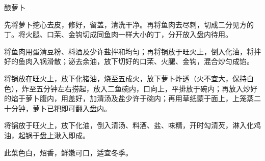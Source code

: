 \begin{recipe}{酿萝卜}

\ingredients



\cooking

\step 先将萝卜挖心去皮，修好，留盖，清洗干净。再将鱼肉去尽刺，切成二分见方的丁。将火腿、口茉、金钩切成同鱼肉一样大小的丁，分开放入盘内待用。

\step 将鱼肉用蛋清豆粉、料酒及少许盐拌和均匀；再将锅放于旺火上，倒入化油，将拌好的鱼肉入锅滑散；泌去余油，放下切好的口茉、火腿、金钩，混合炒匀成馅。

\step 将锅放在旺火上，放下化猪油，烧至五成火，放下萝卜炸透（火不宜大，保持白色），炸至五分钟左右捞起，放入二鱼碗内，口向上，平排放于碗内；再放入炒好的焰于萝卜腹内，用盖好，加清汤及盐少许于碗内；再用草纸蒙于面上，上笼蒸二十分钟，萝卜已粑即可翻入盘内。

\step 将锅放于旺火上，放下化油，倒入清汤、料酒、盐、味精，开时勾清芡，淋入化鸡油，起锅于盘上湫入即成。

\notes

此菜色白，炤香，鲜嫩可口，适宜冬季。

\end{recipe}

